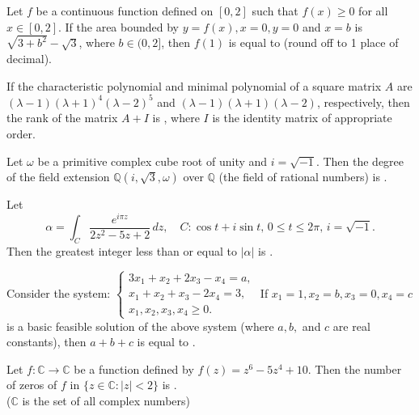\bigskip


\item Let $f$ be a continuous function defined on $[0,2]$ such that $f(x) \geq 0$ for all $x \in [0,2]$. If the area bounded by $y = f(x), x = 0, y = 0$ and $x = b$ is $\sqrt{3 + b^2} - \sqrt{3}$, where $b \in (0,2]$, then $f(1)$ is equal to \underline{\hspace{1cm}} (round off to 1 place of decimal).
\bigskip

\item If the characteristic polynomial and minimal polynomial of a square matrix $A$ are $(\lambda - 1)(\lambda + 1)^4(\lambda - 2)^5$ and $(\lambda - 1)(\lambda + 1)(\lambda - 2)$, respectively, then the rank of the matrix $A + I$ is \underline{\hspace{1cm}}, where $I$ is the identity matrix of appropriate order.
\bigskip

\item Let $\omega$ be a primitive complex cube root of unity and $i = \sqrt{-1}$. Then the degree of the field extension $\mathbb{Q}\left(i, \sqrt{3}, \omega\right)$ over $\mathbb{Q}$ (the field of rational numbers) is \underline{\hspace{1cm}}.
\bigskip

\item Let
\[
\alpha = \int_C \frac{e^{i \pi z}}{2z^2 - 5z + 2} \, dz, \quad C : \cos t + i \sin t, \, 0 \leq t \leq 2\pi, \, i = \sqrt{-1}.
\]
Then the greatest integer less than or equal to $|\alpha|$ is \underline{\hspace{1cm}}.
\bigskip

\item Consider the system:
$
\begin{cases}
3x_1 + x_2 + 2x_3 - x_4 = a, \\
x_1 + x_2 + x_3 - 2x_4 = 3, \\
x_1, x_2, x_3, x_4 \geq 0.
\end{cases}
$
If $x_1 = 1, x_2 = b, x_3 = 0, x_4 = c$ is a basic feasible solution of the above system (where $a, b,$ and $c$ are real constants), then $a + b + c$ is equal to \underline{\hspace{1cm}}.
\bigskip

\item Let $f : \mathbb{C} \to \mathbb{C}$ be a function defined by $f(z) = z^6 - 5z^4 + 10$. Then the number of zeros of $f$ in $\{z \in \mathbb{C} : |z| < 2\}$ is \underline{\hspace{1cm}}. \\
($\mathbb{C}$ is the set of all complex numbers)
\bigskip

